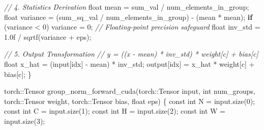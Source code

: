 \documentclass[
  10
]{article}
\newenvironment{Shaded}{}{}
\newcommand{\AttributeTok}[1]{\textcolor[rgb]{0.49,0.56,0.16}{#1}}
\newcommand{\BuiltInTok}[1]{\textcolor[rgb]{0.00,0.50,0.00}{#1}}
\newcommand{\CommentTok}[1]{\textcolor[rgb]{0.38,0.63,0.69}{\textit{#1}}}
\newcommand{\ControlFlowTok}[1]{\textcolor[rgb]{0.00,0.44,0.13}{\textbf{#1}}}
\newcommand{\DataTypeTok}[1]{\textcolor[rgb]{0.56,0.13,0.00}{#1}}
\newcommand{\DecValTok}[1]{\textcolor[rgb]{0.25,0.63,0.44}{#1}}
\newcommand{\FloatTok}[1]{\textcolor[rgb]{0.25,0.63,0.44}{#1}}
\newcommand{\NormalTok}[1]{#1}
\newcommand{\OperatorTok}[1]{\textcolor[rgb]{0.40,0.40,0.40}{#1}}
\begin{document}
\begin{Shaded}
\begin{Highlighting}[]
\CommentTok{// 4. Statistics Derivation}
\DataTypeTok{float}\NormalTok{ mean }\OperatorTok{=}\NormalTok{ sum\_val }\OperatorTok{/}\NormalTok{ num\_elements\_in\_group}\OperatorTok{;}
\DataTypeTok{float}\NormalTok{ variance }\OperatorTok{=} \OperatorTok{(}\NormalTok{sum\_sq\_val }\OperatorTok{/}\NormalTok{ num\_elements\_in\_group}\OperatorTok{)} \OperatorTok{{-}} \OperatorTok{(}\NormalTok{mean }\OperatorTok{*}\NormalTok{ mean}\OperatorTok{);}
\ControlFlowTok{if} \OperatorTok{(}\NormalTok{variance }\OperatorTok{\textless{}} \DecValTok{0}\OperatorTok{)}\NormalTok{ variance }\OperatorTok{=} \DecValTok{0}\OperatorTok{;} \CommentTok{// Floating{-}point precision safeguard}
\DataTypeTok{float}\NormalTok{ inv\_std }\OperatorTok{=} \FloatTok{1.0}\BuiltInTok{f} \OperatorTok{/}\NormalTok{ sqrtf}\OperatorTok{(}\NormalTok{variance }\OperatorTok{+}\NormalTok{ eps}\OperatorTok{);}

\CommentTok{// 5. Output Transformation}
\CommentTok{// y = ((x {-} mean) * inv\_std) * weight[c] + bias[c]}
\DataTypeTok{float}\NormalTok{ x\_hat }\OperatorTok{=} \OperatorTok{(}\NormalTok{input}\OperatorTok{[}\NormalTok{idx}\OperatorTok{]} \OperatorTok{{-}}\NormalTok{ mean}\OperatorTok{)} \OperatorTok{*}\NormalTok{ inv\_std}\OperatorTok{;}
\NormalTok{output}\OperatorTok{[}\NormalTok{idx}\OperatorTok{]} \OperatorTok{=}\NormalTok{ x\_hat }\OperatorTok{*}\NormalTok{ weight}\OperatorTok{[}\NormalTok{c}\OperatorTok{]} \OperatorTok{+}\NormalTok{ bias}\OperatorTok{[}\NormalTok{c}\OperatorTok{];}
\OperatorTok{\}}

\NormalTok{torch}\OperatorTok{::}\NormalTok{Tensor group\_norm\_forward\_cuda}\OperatorTok{(}\NormalTok{torch}\OperatorTok{::}\NormalTok{Tensor input}\OperatorTok{,} \DataTypeTok{int}\NormalTok{ num\_groups}\OperatorTok{,}
\NormalTok{    torch}\OperatorTok{::}\NormalTok{Tensor weight}\OperatorTok{,}\NormalTok{ torch}\OperatorTok{::}\NormalTok{Tensor bias}\OperatorTok{,} \DataTypeTok{float}\NormalTok{ eps}\OperatorTok{)} \OperatorTok{\{}
    \AttributeTok{const} \DataTypeTok{int}\NormalTok{ N }\OperatorTok{=}\NormalTok{ input}\OperatorTok{.}\NormalTok{size}\OperatorTok{(}\DecValTok{0}\OperatorTok{);}
    \AttributeTok{const} \DataTypeTok{int}\NormalTok{ C }\OperatorTok{=}\NormalTok{ input}\OperatorTok{.}\NormalTok{size}\OperatorTok{(}\DecValTok{1}\OperatorTok{);}
    \AttributeTok{const} \DataTypeTok{int}\NormalTok{ H }\OperatorTok{=}\NormalTok{ input}\OperatorTok{.}\NormalTok{size}\OperatorTok{(}\DecValTok{2}\OperatorTok{);}
    \AttributeTok{const} \DataTypeTok{int}\NormalTok{ W }\OperatorTok{=}\NormalTok{ input}\OperatorTok{.}\NormalTok{size}\OperatorTok{(}\DecValTok{3}\OperatorTok{);}


\end{Highlighting}
\end{Shaded}
\end{document}
